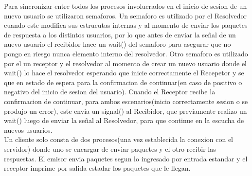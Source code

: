 \documentclass[a4paper,12pt,titlepage]{article}
\begin{document}
Para sincronizar entre todos los procesos involucrados en el inicio de sesion de un nuevo usuario se utilizaron semaforos. Un semaforo es utilizado por el Resolvedor cuando este modifica sus estrucutas internas y al momento de enviar los paquetes de respuesta a los distintos usuarios, por lo que antes de enviar la señal de un nuevo usuario el recibidor hace un wait() del semaforo para asegurar que no pongo en riesgo nunca elemento interno del resolvedor. Otro semaforo es utilizado por el un receptor y el resolvedor al momento de crear un nuevo usuario donde el wait() lo hace el resolvedor esperando que inicie correctamente el Recepetor y se que en estado de espera para la confirmacion de continuar(en caso de positivo o negativo del inicio de sesion del usuario). Cuando el Receptor recibe la confirmacion de continuar, para ambos escenarios(inicio correctamente sesion o se produjo un error), este envia un signal() al Recibidor, que previamente realizo un wait() luego de enviar la señal al Resolvedor, para que continue en la escucha de nuevos usuarios.\\

Un cliente solo consta de dos procesos(una vez establecida la conexion con el servidor) donde uno se encargar de enviar paquetes y el otro recibir las respuestas. El emisor envia paquetes segun lo ingresado por entrada estandar y el receptor imprime por salida estadar los paquetes que le llegan.
\end{document}
